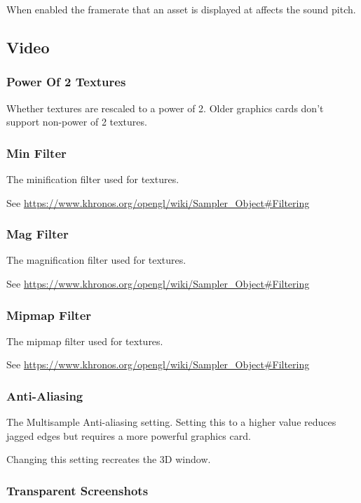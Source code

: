 \documentclass[10pt, a4paper, titlepage, oneside]{article}
\begin{document}
When enabled the framerate that an asset is displayed at affects the sound pitch.

\subsection{Video}

\subsubsection{Power Of 2 Textures}

Whether textures are rescaled to a power of 2. Older graphics cards don't support non-power of 2 textures.

\subsubsection{Min Filter}

The minification filter used for textures.

\sloppy
See \url{https://www.khronos.org/opengl/wiki/Sampler_Object#Filtering}

\subsubsection{Mag Filter}

The magnification filter used for textures.

\sloppy
See \url{https://www.khronos.org/opengl/wiki/Sampler_Object#Filtering}

\subsubsection{Mipmap Filter}

The mipmap filter used for textures.

\sloppy
See \url{https://www.khronos.org/opengl/wiki/Sampler_Object#Filtering}

\subsubsection{Anti-Aliasing}

The Multisample Anti-aliasing setting. Setting this to a higher value reduces jagged edges but requires a more powerful graphics card.

 Changing this setting recreates the 3D window.
 
 \subsubsection{Transparent Screenshots}
\end{document}
